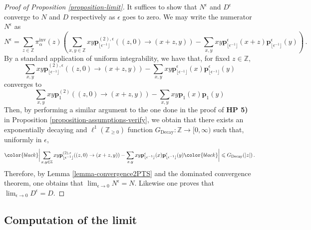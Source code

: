 \documentclass[a4paper,11pt,oneside,reqno]{amsart}
\theoremstyle{definition}
\renewcommand{\leq}{\leqslant}
\renewcommand{\geq}{\geqslant}
\numberwithin{equation}{section}
\begin{document}
\begin{proof}[Proof of Proposition \ref{proposition-limit}] It suffices to show that $N^{\epsilon}$ and $D^{\epsilon}$ converge to $N$ and $D$ respectively as $\epsilon$ goes to zero. 
We may write the numerator $N^{\epsilon}$ as 
\begin{equation*}
	N^{\epsilon}=\sum_{z\in \mathbb{Z}}\pi^{\text{inv}}_{\alpha}(z)\left(\sum_{x,y\in \mathbb{Z}}xy\mathbf{p}^{(2),\epsilon}_{\lfloor \epsilon^{-1}\rfloor}((z,0)\to(x+z,y))-\sum_{x,y}xy\mathbf{p}_{\lfloor \epsilon^{-1}\rfloor}^{\epsilon}(x+z)\mathbf{p}_{\lfloor \epsilon^{-1}\rfloor}^{\epsilon}(y)\right)\,.
\end{equation*}
{\color{black}By a standard application of uniform integrability, we have that, for fixed $z\in \mathbb{Z}$, 
\begin{equation*}
	\sum_{x,y}xy\mathbf{p}_{\lfloor \epsilon^{-1}\rfloor}^{(2),\epsilon}((z,0)\to (x+z,y))-\sum_{x,y}xy \mathbf{p}_{\lfloor \epsilon^{-1}\rfloor}^{\epsilon}(x)\mathbf{p}_{\lfloor \epsilon^{-1}\rfloor}^{\epsilon}(y)
\end{equation*}
converges to 
\begin{equation*}
	\sum_{x,y}xy\mathbf{p}_{1}^{(2)}((z,0)\to (x+z,y))-\sum_{x,y}xy \mathbf{p}_{1}(x)\mathbf{p}_{1}(y)
\end{equation*}
Then,} by performing a similar argument to the one done in the proof of \textbf{HP 5)} in Proposition \ref{proposition-assumptions-verify}, we obtain that there exists an exponentially decaying  and $\ell^{1}(\mathbb{Z}_{\geq 0})$ function $G_{\text{Decay}}:\mathbb{Z}\to[0,\infty)$ such that, uniformly in $\epsilon$,  
\begin{equation*}
{\color{black}\bigg|}\sum_{x,y\in \mathbb{Z}}xy\mathbf{p}^{(2),\epsilon}_{\lfloor\epsilon^{-1}\rfloor}((z,0)\to(x+z,y))-\sum_{x,y}xy\mathbf{p}_{\lfloor\epsilon^{-1}\rfloor}^{\epsilon}(x)\mathbf{p}^{\epsilon}_{\lfloor\epsilon^{-1}\rfloor}(y){\color{black}\bigg|}\leq G_{\text{Decay}}(|z|)\,.
\end{equation*}
Therefore, by Lemma \ref{lemma-convergence2PTS} and the dominated convergence theorem, one obtains that $\lim_{\epsilon\to 0}N^{\epsilon}=N$. Likewise  one proves that $\lim_{\epsilon\to 0}D^{\epsilon}=D$. 
\end{proof}
\subsection{Computation of the limit}
\end{document}

